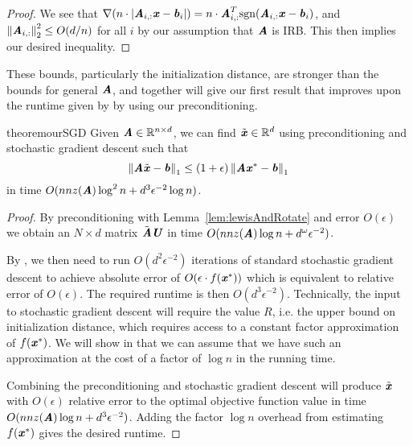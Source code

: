 
\begin{proof} We see that $\nabla (n \cdot |\AA_{i,:}\xx - \bb_i|) = n \cdot \AA_{i,:}^T\sgn{\AA_{i,:}\xx - \bb_i} $, and $\norme{\AA_{i,:}}^2 \leq O(d/n)$ for all $i$ by our assumption that $\AA$ is IRB. This then implies our desired inequality.
\end{proof}

These bounds, particularly the initialization distance, are stronger than the bounds for general $\AA$, and together will give our first result that improves upon the runtime given by \cite{YangCRM16} by using our preconditioning.

\begin{restatable}[]{theorem}{ourSGD}
	\label{thm:ourSGD}
	Given $\AA \in \R^{n\times d}$, we can find $\tilde{\xx}\in \R^d$ using preconditioning and stochastic gradient descent such that 
	\[
	\norm{\AA\tilde{\xx} - \bb}_1 \leq (1 + \epsilon)\norm{\AA \xx^* - \bb}_1
	\]	
	in time $O(nnz(\AA)\log^2{n} + d^3\epsilon^{-2}\log{n})$.
\end{restatable}

\begin{proof}
	By preconditioning with Lemma~\ref{lem:lewisAndRotate} and error $O(\epsilon)$ we obtain an $N \times d$ matrix $\tilde{\AA}\UU$ in time $O(nnz(\AA)\log{n} + d^{\omega}\epsilon^{-2})$.
	
	By , we then need to run $O(d^2 \epsilon^{-2})$ iterations of standard stochastic gradient descent to achieve absolute error of $O(\epsilon\cdot f(\xx^*))$ which is equivalent to relative error of $O(\epsilon)$. The required runtime is then $O(d^3\epsilon^{-2})$. Technically, the input to stochastic gradient descent will require the value $R$, i.e. the upper bound on initialization distance, which requires access to a constant factor approximation of $f(\xx^*)$. We will show in  that we can assume that we have such an approximation at the cost of a factor of $\log{n}$ in the running time.
	
	Combining the preconditioning and stochastic gradient descent will produce $\tilde{\xx}$ with $O(\epsilon)$ relative error to the optimal objective function value in time $O(nnz(\AA)\log{n} + d^3\epsilon^{-2})$. Adding the factor $\log{n}$ overhead from estimating $f(\xx^*)$ gives the desired runtime.
\end{proof}


